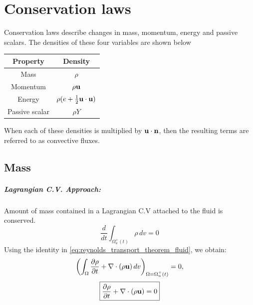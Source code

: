\documentclass[oneside,a4paper,11pt]{report}
\begin{document}
\chapter{Conservation laws}
Conservation laws describe changes in mass, momentum, energy and passive scalars. The densities of these four variables are shown below 
\begin{center}
\begin{tabular}{|c|c|}
\hline
Property & Density  \\
\hline
Mass & $\rho$  \\
\hline
Momentum & $\rho \mathbf{u}$ \\ 
\hline
Energy & $\rho (e+\frac{1}{2}\mathbf{u} \cdot \mathbf{u} )$ \\
\hline
Passive scalar & $\rho Y$ \\
\hline
\end{tabular}
\end{center}
When each of these densities is multiplied by $\mathbf{u} \cdot \mathbf{n}$, then the resulting terms are referred to as convective fluxes.

\section{Mass}
\paragraph{Lagrangian C.V. Approach:}
Amount of mass contained in a Lagrangian C.V attached to the fluid is conserved.
\begin{equation}
    \frac{d}{dt}\int_{\Omega^+_u(t)} \rho \,dv = 0
\end{equation}
Using the identity in \cref{eq:reynolds_transport_theorem_fluid}, we obtain:
\begin{equation}
\left ( \int_{\Omega} \frac{\partial\rho}{\partial t}+\nabla \cdot (\rho \mathbf{u})\,dv \right)_{\Omega = \Omega^+_u(t)} =0,
\end{equation}
\begin{equation}
\boxed{\frac{\partial\rho}{\partial t}+\nabla \cdot (\rho \mathbf{u})=0}
\end{equation}
\end{document}
